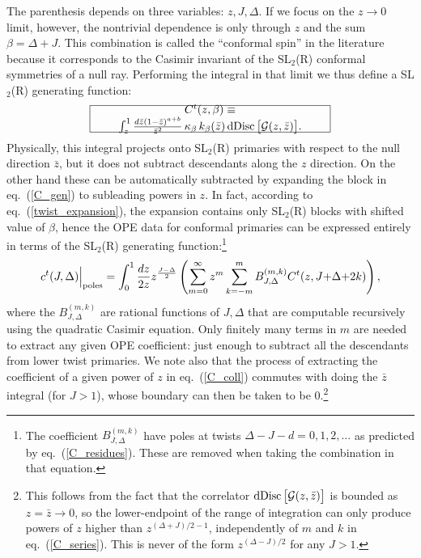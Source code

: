 \documentclass[11pt, reqno,preprint]{article}
\def\be{\begin{equation}}
\def\ee{\end{equation}}
\def\dDisc{{\rm dDisc}\,}
\def\zbar{\bar{z}}
\def\j{J}
\def\GG{\mathcal{G}}
\begin{document}
The parenthesis depends on three variables: $z,\j,\Delta$. If we focus on the $z\to 0$ limit,
however, the nontrivial dependence is only through $z$ and the sum $\beta=\Delta+\j$.
This combination is called the ``conformal spin'' in the literature because it corresponds
to the Casimir invariant of the SL${}_2$(R) conformal symmetries of a null ray.
Performing the integral in that limit we thus define a SL${}_2$(R) generating function:
\be\label{C_coll}
\framebox{\begin{minipage}[c][4ex][c]{.6\textwidth}\centering{$
 C^{t}(z,\beta) \equiv \int_z^1 \frac{d\zbar(1-\zbar)^{a+b}}{\zbar^2} \,\kappa_\beta\,k_\beta(\zbar) \,\dDisc\big[\GG(z,\zbar)\big].$}\end{minipage}}
\ee
Physically, this integral projects onto SL${}_2$(R) primaries with respect to the null direction $\zbar$,
but it does not subtract descendants along the $z$ direction.
On the other hand
these can be automatically subtracted by expanding the block in eq.~(\ref{C_gen}) to subleading powers 
in $z$.  In fact, according to eq.~(\ref{twist_expansion}), the expansion contains only SL${}_2$(R) blocks with shifted value of $\beta$,
hence the OPE data for conformal primaries can be expressed entirely in terms of the SL${}_2$(R) generating function:\footnote{The coefficient $B^{(m,k)}_{\j,\Delta}$ have poles
at twists $\Delta-\j-d=0,1,2,\ldots$ as predicted by eq.~(\ref{C_residues}). These are removed when taking the combination
in that equation.}
\be
c^t(\j,\Delta)\Big|_{\rm poles} = \int_0^1 \frac{dz}{2z} z^{\frac{\j-\Delta}{2}}
\left(\sum_{m=0}^\infty z^{m}  \sum_{k=-m}^m B^{(m,k)}_{\j,\Delta} C^t(z,\j{+}\Delta{+}2k)\right), \label{C_series}
\ee
where the $B^{(m,k)}_{\j,\Delta}$ are rational functions of $\j,\Delta$ that are computable
recursively using the quadratic Casimir equation.  
Only finitely many terms in $m$ are needed to extract any given OPE coefficient: just enough to subtract all the descendants from lower twist primaries.
We note also that the process of extracting the coefficient of a given power of $z$ in eq.~(\ref{C_coll}) commutes with
doing the $\zbar$ integral (for $\j>1$), whose boundary can then be taken to be $0$.\footnote{
This follows from the fact that the correlator $\dDisc\big[\GG(z,\zbar)\big]$ is bounded as $z=\zbar\to 0$,
so the lower-endpoint of the range of integration can only produce powers of $z$ higher than $z^{(\Delta+\j)/2-1}$,
independently of $m$ and $k$ in eq.~(\ref{C_series}). This is never of the form $z^{(\Delta-\j)/2}$ for any $\j>1$.}
\end{document}
